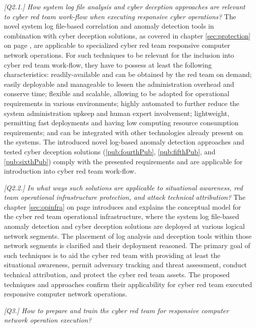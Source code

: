 \textit{[Q2.1.] How system log file analysis and cyber deception approaches are relevant to cyber red team work-flow when executing responsive cyber operations?}
The novel system log file-based correlation and anomaly detection tools in combination with cyber deception solutions, as covered in chapter \ref{sec:protection} on page \pageref{sec:protection}, are applicable to specialized cyber red team responsive computer network operations. For such techniques to be relevant for the inclusion into cyber red team work-flow, they have to possess at least the following characteristics: readily-available and can be obtained by the red team on demand; easily deployable and manageable to lessen the administration overhead and conserve time; flexible and scalable, allowing to be adapted for operational requirements in various environments; highly automated to further reduce the system administration upkeep and human expert involvement; lightweight, permitting fast deployments and having low computing resource consumption requirements; and can be integrated with other technologies already present on the systems. The introduced novel log-based anomaly detection approaches and tested cyber deception solutions (\ref{pub:fourthPub}, \ref{pub:fifthPub}, and \ref{pub:sixthPub}) comply with the presented requirements and are applicable for introduction into cyber red team work-flow.

\textit{[Q2.2.] In what ways such solutions are applicable to situational awareness, red team operational infrastructure protection, and attack technical attribution?}
The chapter \ref{sec:opinfra} on page \pageref{sec:opinfra} introduces and explains the conceptual model for the cyber red team operational infrastructure, where the system log file-based anomaly detection and cyber deception solutions are deployed at various logical network segments. The placement of log analysis and deception tools within those network segments is clarified and their deployment reasoned. The primary goal of such techniques is to aid the cyber red team with providing at least the situational awareness, permit adversary tracking and threat assessment, conduct technical attribution, and protect the cyber red team assets. The proposed techniques and approaches confirm their applicability for cyber red team executed responsive computer network operations.

\textit{[Q3.] How to prepare and train the cyber red team for responsive computer network operation execution?}

